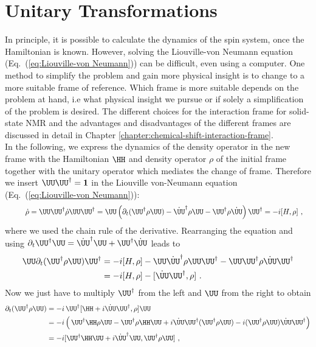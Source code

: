 \newpage

\section{Unitary Transformations}
\label{sec:unitary-trafo}
In principle, it is possible to calculate the dynamics of the spin system, once the Hamiltonian is known.
However, solving the Liouville-von Neumann equation (Eq.~(\ref{eq:Liouville-von Neumann})) can be difficult, even using a computer.
One method to simplify the problem and gain more physical insight is to change to a more suitable frame of reference.
Which frame is more suitable depends on the problem at hand, i.e what physical insight we pursue or if solely a simplification of the problem is desired. The different choices for the interaction frame for solid-state NMR and the advantages and disadvantages of the different frames are discussed in detail in Chapter \ref{chapter:chemical-shift-interaction-frame}.
\\
In the following, we express the dynamics of the density operator in the new frame with the Hamiltonian $\HH$ and density operator $\rho$ of the initial frame together with the unitary operator which mediates the change of frame. Therefore we insert $\UU\UU^{\dagger} = \mathbf{1}$ in the Liouville von-Neumann equation (Eq.~(\ref{eq:Liouville-von Neumann})):
\begin{align}
  &\hphantom{\,\implies\,\,}\dot{\rho} = \UU\UU^{\dagger} \dot{\rho}\UU\UU^{\dagger} = \UU \left( \partial_t (\UU^{\dagger}\rho \UU) - \dot{\UU}^{\dagger} \rho \UU - \UU^{\dagger} \rho \dot{\UU}\right)\UU^\dagger = -i [H,\rho]~,
\end{align}
where we used the chain rule of the derivative.
Rearranging the equation and using $\partial_t{\UU^{\dagger}\UU}=\dot{\UU}^\dagger\UU+\UU^\dagger\dot{\UU}$ leads to
\begin{align}
  \UU\partial_t (\UU^{\dagger}\rho \UU)\UU^\dagger &= -i [H,\rho] - \UU\dot{\UU}^\dagger\rho \UU\UU^\dagger-\UU\UU^\dagger\rho \dot{\UU}\UU^\dagger \\
  &= -i [H,\rho] - [\dot{\UU}\UU^\dagger,\rho]~.
\end{align}
Now we just have to multiply $\UU^{\dagger}$ from the left and $\UU$ from the right to obtain
\begin{align}
  \partial_t (\UU^{\dagger}\rho \UU)&= -i\, \UU^{\dagger}[ \HH  + i \dot{\UU}\UU^\dagger, \rho]\UU\\
                                    &= -i\left(\,\UU^{\dagger}\HH\rho\UU-\UU^{\dagger}\rho\HH\UU+i\dot{\UU}\UU^\dagger(\UU^{\dagger}\rho\UU)-i(\UU^{\dagger}\rho\UU)\dot{\UU}\UU^\dagger\right)\\
                                         &=  -i[\UU^\dagger \HH \UU  + i \dot{\UU}^\dagger \UU, \UU^{\dagger}\rho \UU]~,
\end{align}
